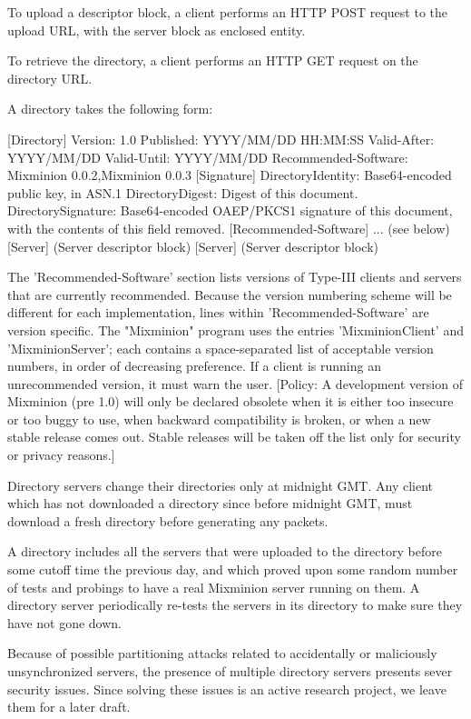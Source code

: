 To upload a descriptor block, a client performs an HTTP POST request
to the upload URL, with the server block as enclosed entity.

To retrieve the directory, a client performs an HTTP GET request on
the directory URL.

A directory takes the following form:

 [Directory]
 Version: 1.0
 Published: YYYY/MM/DD HH:MM:SS
 Valid-After: YYYY/MM/DD
 Valid-Until: YYYY/MM/DD
 Recommended-Software: Mixminion 0.0.2,Mixminion 0.0.3
 [Signature]
 DirectoryIdentity: Base64-encoded public key, in ASN.1
 DirectoryDigest: Digest of this document.
 DirectorySignature: Base64-encoded OAEP/PKCS1 signature of this document, with
     the contents of this field removed.
 [Recommended-Software]
 ... (see below)
 [Server]
     (Server descriptor block)
 [Server]
     (Server descriptor block)

The 'Recommended-Software' section lists versions of Type-III clients
and servers that are currently recommended.  Because the version
numbering scheme will be different for each implementation, lines
within 'Recommended-Software' are version specific.  The "Mixminion"
program uses the entries 'MixminionClient' and 'MixminionServer'; each
contains a space-separated list of acceptable version numbers, in
order of decreasing preference.  If a client is running an
unrecommended version, it must warn the user.  [Policy: A development
version of Mixminion (pre 1.0) will only be declared obsolete when it 
is either too insecure or too buggy to use, when backward
compatibility is broken, or when a new stable release comes out.
Stable releases will be taken off the list only for security or
privacy reasons.]

Directory servers change their directories only at midnight GMT.  Any
client which has not downloaded a directory since before midnight GMT,
must download a fresh directory before generating any packets.

A directory includes all the servers that were uploaded to the
directory before some cutoff time the previous day, and which proved
upon some random number of tests and probings to have a real Mixminion
server running on them.  A directory server periodically re-tests
the servers in its directory to make sure they have not gone down.

Because of possible partitioning attacks related to accidentally or
maliciously unsynchronized servers, the presence of multiple directory
servers presents sever security issues.  Since solving these issues is
an active research project, we leave them for a later draft.


